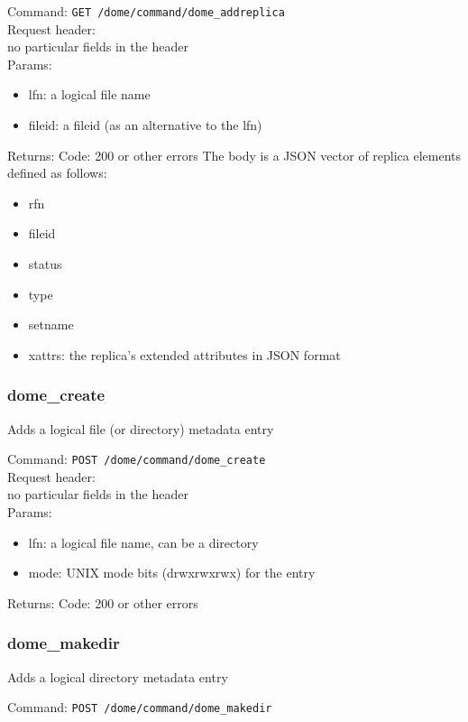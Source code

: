 \documentclass[a4paper,10pt]{scrreprt}
\begin{document}
Command:
\lstinline"GET /dome/command/dome_addreplica"\\

Request header:\\
no particular fields in the header\\

Params:
\begin{itemize}
 \item lfn: a logical file name
 \item fileid: a fileid (as an alternative to the lfn)
\end{itemize}

Returns:
Code: 200 or other errors
The body is a JSON vector of replica elements defined as follows:
\begin{itemize}
 \item rfn
 \item fileid
 \item status
 \item type
 \item setname
 \item xattrs: the replica's extended attributes in JSON format
\end{itemize}


\subsubsection{dome\_create}
Adds a logical file (or directory) metadata entry

Command:
\lstinline"POST /dome/command/dome_create"\\

Request header:\\
no particular fields in the header\\

Params:
\begin{itemize}
 \item lfn: a logical file name, can be a directory
 \item mode: UNIX mode bits (drwxrwxrwx) for the entry
\end{itemize}

Returns:
Code: 200 or other errors

\subsubsection{dome\_makedir}
Adds a logical directory metadata entry

Command:
\lstinline"POST /dome/command/dome_makedir"\\
\end{document}
